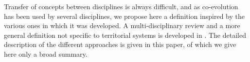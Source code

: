 \documentclass[11pt]{article}
\begin{document}
Transfer of concepts between disciplines is always difficult, and as co-evolution has been used by several disciplines, we propose here a definition inspired by the various ones in which it was developed. A multi-disciplinary review and a more general definition not specific to territorial systems is developed in \cite{raimbault2018co}. The detailed description of the different approaches is given in this paper, of which we give here only a broad summary.
\end{document}
